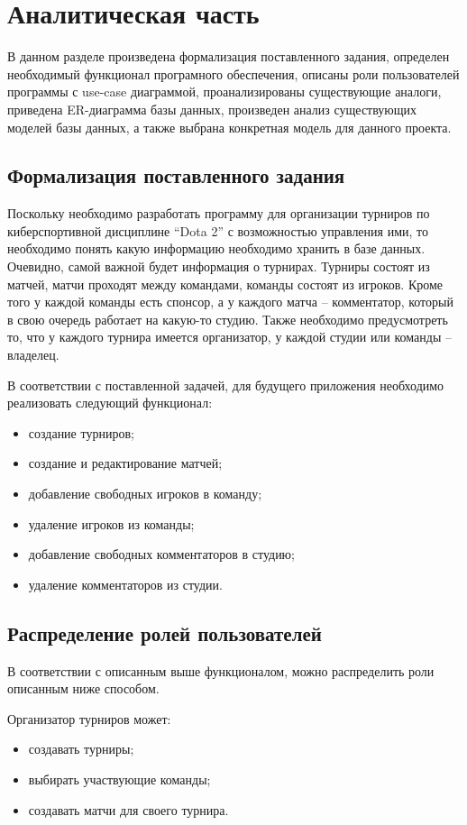 \chapter{Аналитическая часть}
\label{cha:analysis}

В данном разделе произведена формализация поставленного задания, определен необходимый функционал програмного обеспечения, описаны роли пользователей программы с use-case диаграммой, проанализированы существующие аналоги, приведена ER-диаграмма базы данных, произведен анализ существующих моделей базы данных, а также выбрана конкретная модель для данного проекта.

\section{Формализация поставленного задания}
Поскольку необходимо разработать программу для организации турниров по киберспортивной дисциплине “Dota 2” с возможностью управления ими, то необходимо понять какую информацию необходимо хранить в базе данных. Очевидно, самой важной будет информация о турнирах. Турниры состоят из матчей, матчи проходят между командами, команды состоят из игроков. Кроме того у каждой команды есть спонсор, а у каждого матча -- комментатор, который в свою очередь работает на какую-то студию. Также необходимо предусмотреть то, что у каждого турнира имеется организатор, у каждой студии или команды -- владелец.

В соответствии с поставленной задачей, для будущего приложения необходимо реализовать следующий функционал:
\begin{itemize}
	\item создание турниров;
	\item создание и редактирование матчей;
	\item добавление свободных игроков в команду;
	\item удаление игроков из команды;
	\item добавление свободных комментаторов в студию;
	\item удаление комментаторов из студии.
\end{itemize}

\section{Распределение ролей пользователей}
В соответствии с описанным выше функционалом, можно распределить роли описанным ниже способом.

Организатор турниров может:
\begin{itemize}
	\item создавать турниры;
	\item выбирать участвующие команды;
	\item создавать матчи для своего турнира.
\end{itemize}

